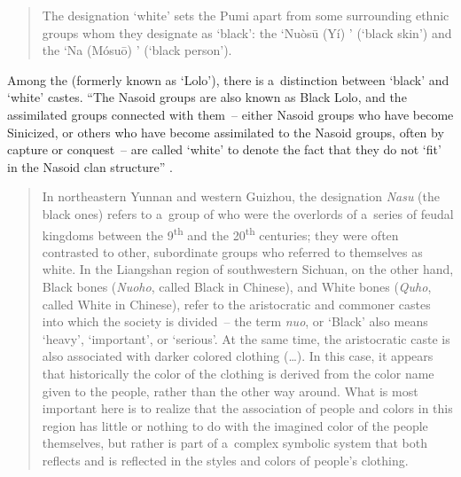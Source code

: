 \begin{quotation}
The designation  ‘white’ sets the {Pumi} apart from some surrounding ethnic groups whom they designate as  ‘black’: the  ‘{Nuòsū} (Yí) ’ (‘black skin’) and the  ‘Na (Mósuō) ’ (‘black person’). \citep[2]{daudey2014}
\end{quotation}

{\noindent}Among the   (formerly known as ‘{Lolo}’), there is a~distinction between ‘black’ and ‘white’ castes. “The {Nasoid} groups are also known as Black {Lolo}, and the assimilated groups connected with them~-- either {Nasoid} groups who have become Sinicized, or others who have become assimilated to the {Nasoid} groups, often by capture or conquest~-- are called ‘white’ to denote the fact that they do not ‘fit’ in the {Nasoid} clan structure” \citep[53]{bradley1979}.

\begin{quotation}
In northeastern Yunnan and western Guizhou, the designation \textit{Nasu} (the black ones) refers to a~group of 
 who were the overlords of a~series of feudal kingdoms between the 9\textsuperscript{th} and the 20\textsuperscript{th} centuries;
they were often contrasted to other, subordinate groups who referred to themselves as white.  In the Liangshan region of southwestern Sichuan, on the other hand, Black bones (\textit{Nuoho}, called Black  in 
Chinese), and White bones (\textit{Quho}, called White  in Chinese), refer to the aristocratic and commoner castes into which the society is divided~-- the term \textit{nuo}, or ‘Black' also means ‘heavy', ‘important', or ‘serious'. At the same time, the aristocratic caste is also associated with darker colored clothing ({\dots}).
In this case, it appears that historically the color of the clothing is derived from
the color name given to the people, rather than the other way around. What is most important here is to realize that the association of people and colors in this region has little or nothing to do with the imagined color of the people themselves, but rather is part of a~complex symbolic system that both reflects and is reflected in the styles and colors of people's clothing. \citep[102]{harrell2009}
\end{quotation}

